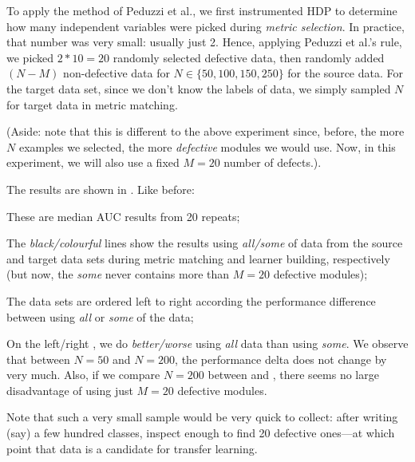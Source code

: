   To apply the method of Peduzzi et al., we first instrumented HDP to determine how many
  independent variables were picked during {\em metric  selection}. In practice, that number
  was very small: usually just 2. Hence, applying  Peduzzi et al.'s rule, we picked $2*10=20$ 
  randomly selected defective data, then randomly added $(N-M)$ non-defective data for
  $N\in \{50,100,150,250\}$ for the source data. For the target data set, since we don't
  know the labels of data, we simply sampled $N$ for target data in metric matching.

  (Aside: note that this is different to the above experiment since, before, the more $N$ examples
  we selected, the more {\em defective} modules we would use. Now, in this experiment, we will also
  use a fixed $M=20$ number of defects.).

  The results are shown in . Like before:
  \bi
  \item These are median AUC results from 20 repeats;
\item
  The {\em black/colourful} lines show the results using {\em all/some} of  data from
  the source and target data sets during metric matching and learner building, respectively
  (but now, the {\em some} never contains more than $M=20$ defective modules);
\item
  The data sets are ordered left to right according
  the performance difference between using
   {\em all} or {\em some} of the data;
   \item
     On the left/right ,  we do {\em better/worse} using
  {\em all} data than using {\em some}.
  \ei
  We observe that between $N=50$ and $N=200$, the performance delta
  does not change by very much. Also, if we compare $N=200$ between 
  and , there seems no large disadvantage of using just
  $M=20$ defective modules.

  Note that such a very small sample would be very quick to collect: after writing (say) a few
  hundred classes, inspect enough to find 20 defective ones---at which point that data is a candidate
  for transfer learning.
